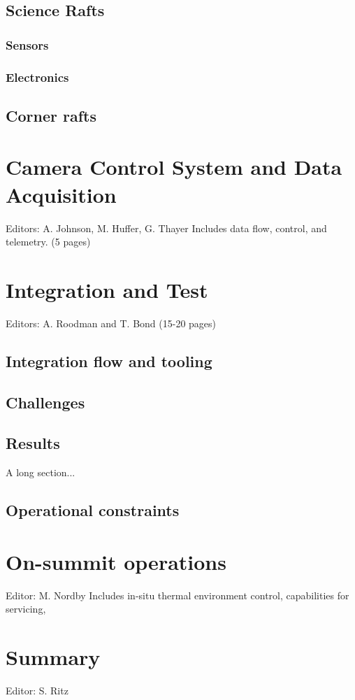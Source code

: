 \subsection{Science Rafts}
\subsubsection{Sensors}
\subsubsection{Electronics}
\subsection{Corner rafts}

\section{Camera Control System and Data Acquisition}
Editors: A. Johnson, M. Huffer, G. Thayer
Includes data flow, control, and telemetry.
(5 pages)

\section{Integration and Test}
Editors: A. Roodman and T. Bond
(15-20 pages)
\subsection{Integration flow and tooling}
\subsection{Challenges}
\subsection{Results}
A long section...
\subsection{Operational constraints}

\section{On-summit operations}
Editor: M. Nordby
Includes in-situ thermal environment control, capabilities for servicing, 

\section{Summary}
Editor: S. Ritz
